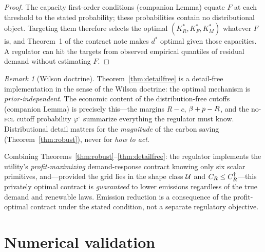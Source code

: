 \documentclass[11pt,reqno]{amsart}
\theoremstyle{plain}
\theoremstyle{definition}\newtheorem{definition}{Definition}\newtheorem{assumption}{Assumption}
\theoremstyle{remark}\newtheorem{remark}{Remark}
\newcommand{\KRs}{K_R^{*}}\newcommand{\KFs}{K_F^{*}}\newcommand{\KMs}{K_M^{*}}
\newcommand{\dstar}{d^{*}}
\begin{document}
\begin{proof}
The capacity first-order conditions (companion Lemma) equate $F$ at each threshold
to the stated probability; these probabilities contain no distributional object.
Targeting them therefore selects the optimal $(\KRs,\KFs,\KMs)$ whatever $F$ is,
and Theorem~1 of the contract note makes $\dstar$ optimal given those capacities.
A regulator can hit the targets from observed empirical quantiles of residual
demand without estimating $F$.
\end{proof}

\begin{remark}[Wilson doctrine]
Theorem~\ref{thm:detailfree} is a detail-free implementation in the sense of the
Wilson doctrine: the optimal mechanism is \emph{prior-independent}. The economic
content of the distribution-free cutoffs (companion Lemma) is precisely this---the
margins $R-c$, $\beta+p-R$, and the no-\textsc{fcl} cutoff probability $\varphi^{\circ}$
summarize everything
the regulator must know. Distributional detail matters for the \emph{magnitude} of
the carbon saving (Theorem~\ref{thm:robust}), never for \emph{how to act}.
\end{remark}

\begin{corollary}
Combining Theorems~\ref{thm:robust}--\ref{thm:detailfree}: the regulator implements
the utility's \emph{profit-maximizing} demand-response contract knowing only six
scalar primitives, and---provided the grid lies in the shape class $\mathcal U$ and
$C_R\le C_R^{\dagger}$---this privately optimal contract is \emph{guaranteed} to
lower emissions regardless of the true demand and renewable laws. Emission
reduction is a consequence of the profit-optimal contract under the stated
condition, not a separate regulatory objective.
\end{corollary}

\section{Numerical validation}\label{sec:num}
\end{document}
